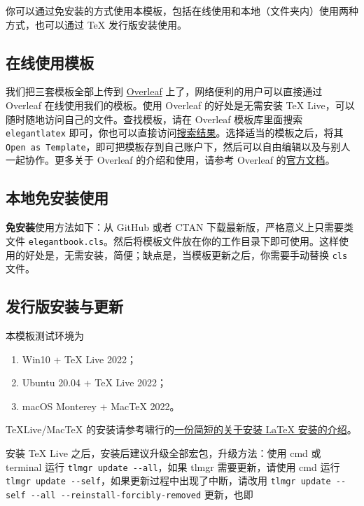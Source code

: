 \documentclass[lang=cn,newtx,10pt,scheme=chinese]{elegantbook}
\begin{document}
你可以通过免安装的方式使用本模板，包括在线使用和本地（文件夹内）使用两种方式，也可以通过 \TeX{} 发行版安装使用。

\subsection{在线使用模板}

我们把三套模板全部上传到 \href{https://www.overleaf.com/}{Overleaf} 上了，网络便利的用户可以直接通过 Overleaf 在线使用我们的模板。使用 Overleaf 的好处是无需安装 \TeX{} Live，可以随时随地访问自己的文件。查找模板，请在 Overleaf 模板库里面搜索 \lstinline{elegantlatex} 即可，你也可以直接访问\href{https://www.overleaf.com/latex/templates?addsearch=elegantlatex}{搜索结果}。选择适当的模板之后，将其 \lstinline{Open as Template}，即可把模板存到自己账户下，然后可以自由编辑以及与别人一起协作。更多关于 Overleaf 的介绍和使用，请参考 Overleaf 的\href{https://www.overleaf.com/learn}{官方文档}。

\subsection{本地免安装使用}

\textbf{免安装}使用方法如下：从 GitHub 或者 CTAN 下载最新版，严格意义上只需要类文件 \lstinline{elegantbook.cls}。然后将模板文件放在你的工作目录下即可使用。这样使用的好处是，无需安装，简便；缺点是，当模板更新之后，你需要手动替换 \lstinline{cls} 文件。

\subsection{发行版安装与更新}

本模板测试环境为 
\begin{enumerate}
  \item Win10 + \TeX{} Live 2022；
  \item Ubuntu 20.04 + \TeX{} Live 2022；
  \item macOS Monterey + Mac\TeX{} 2022。
\end{enumerate}

\TeX Live/Mac\TeX{} 的安装请参考啸行的\href{https://github.com/OsbertWang/install-latex-guide-zh-cn/releases/}{一份简短的关于安装 \LaTeX{} 安装的介绍}。

安装 \TeX{} Live 之后，安装后建议升级全部宏包，升级方法：使用 cmd 或 terminal 运行 \lstinline{tlmgr update --all}，如果 tlmgr 需要更新，请使用 cmd 运行 \lstinline{tlmgr update --self}，如果更新过程中出现了中断，请改用 \lstinline{tlmgr update --self --all --reinstall-forcibly-removed} 更新，也即
\end{document}
